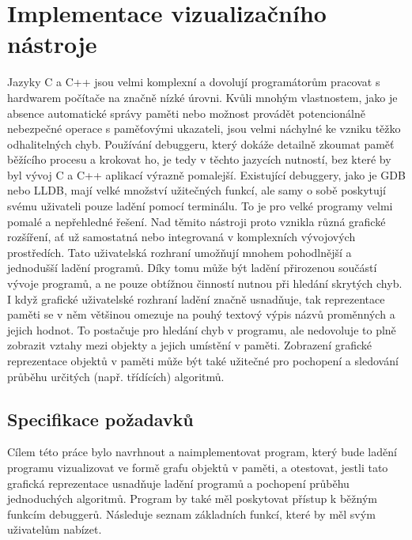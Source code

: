 \documentclass[bc,male,python,dept460]{diploma}						%
\begin{document}
\section{Implementace vizualizačního nástroje}
	Jazyky C a C++ jsou velmi komplexní a dovolují programátorům pracovat s hardwarem počítače na značně nízké úrovni. Kvůli mnohým vlastnostem,
	jako je absence automatické správy paměti nebo možnost provádět potencionálně nebezpečné operace s paměťovými ukazateli, jsou velmi náchylné ke vzniku
	těžko odhalitelných chyb. Používání debuggeru, který dokáže detailně zkoumat paměť běžícího procesu a krokovat ho, je tedy v těchto jazycích nutností,
	bez které by byl vývoj C a C++ aplikací výrazně pomalejší.
	Existující debuggery, jako je GDB nebo LLDB, mají velké množství užitečných funkcí, ale samy o sobě poskytují svému uživateli pouze ladění
	pomocí terminálu. To je pro velké programy velmi pomalé a nepřehledné řešení. Nad těmito nástroji proto vznikla různá grafické rozšíření,
	ať už samostatná nebo integrovaná v komplexních vývojových prostředích. Tato uživatelská rozhraní umožňují mnohem pohodlnější a jednodušší ladění programů.
	Díky tomu může být ladění přirozenou součástí vývoje programů, a ne pouze obtížnou činností nutnou při hledání skrytých chyb.
	I když grafické uživatelské rozhraní ladění značně usnadňuje, tak reprezentace paměti se v něm většinou omezuje na pouhý textový výpis názvů proměnných
	a jejich hodnot. To postačuje pro hledání chyb v programu, ale nedovoluje to plně zobrazit vztahy mezi objekty a jejich umístění v paměti.
	Zobrazení grafické reprezentace objektů v paměti může být také užitečné pro pochopení a sledování průběhu určitých (např. třídících) algoritmů.

	\subsection{Specifikace požadavků}
	Cílem této práce bylo navrhnout a naimplementovat program, který bude ladění programu vizualizovat ve formě grafu objektů v paměti, a otestovat,
	jestli tato grafická reprezentace usnadňuje ladění programů a pochopení průběhu jednoduchých algoritmů.
	Program by také měl poskytovat přístup k běžným funkcím debuggerů.
	Následuje seznam základních funkcí, které by měl svým uživatelům nabízet.
	
\end{document}
